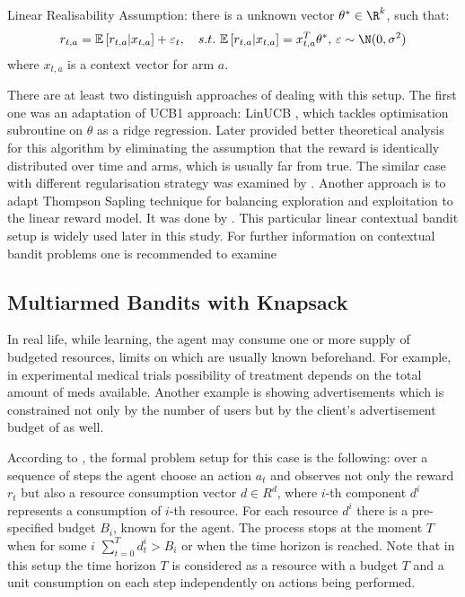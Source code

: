   \begin{definition}
      Linear Realisability Assumption: there is a unknown vector $\theta^* \in \R^k$, such that: 
        \begin{equation*}
                r_{t,a} = \E\left[r_{t,a}|x_{t,a}\right] + \varepsilon_t, \quad s.t. \,\E\left[r_{t,a}|x_{t,a}\right] = x_{t,a}^T\theta^*,\, \varepsilon \sim \N(0, \sigma^2)
        \end{equation*}  
        where $x_{t,a}$ is a context vector for arm $a$.
  \end{definition}
  There are at least two distinguish approaches of dealing with this setup. The first one was an adaptation of UCB1 approach: LinUCB \cite{Li2010}, which tackles optimisation subroutine on $\theta$ as a ridge regression. Later \cite{Abbasi-Yadkori2011} provided better theoretical analysis for this algorithm by eliminating the assumption that the reward is identically distributed over time and arms, which is usually far from true. The similar case with different regularisation strategy was examined by \cite{Auer2003}. Another approach is to adapt Thompson Sapling technique \cite{Li2011} for balancing exploration and exploitation to the linear reward model. It was done by \cite{Agrawal2013}. This particular linear contextual bandit setup is widely used later in this study. For further information on contextual bandit problems one is recommended to examine \cite{Zhou2015}
  
  \subsection{Multiarmed Bandits with Knapsack}
  In real life, while learning, the agent may consume one or more supply of budgeted resources, limits on which are usually known beforehand. For example, in experimental medical trials possibility of treatment depends on the total amount of meds available. Another example is showing advertisements which is constrained not only by the number of users but by the client's advertisement budget of as well. 
  
  According to \cite{Badanidiyuru2013}, the formal problem setup for this case is the following: over a sequence of steps the agent choose an action $a_t$ and observes not only the reward $r_t$ but also a resource consumption vector $d \in R^d$, where $i$-th component $d^i$ represents a consumption of $i$-th resource. For each resource $d^i$ there is a pre-specified budget $B_i$, known for the agent. The process stops at the moment $T$ when for some $i$ $\sum_{t=0}^Td^i_t > B_i$ or when the time horizon is reached. Note that in this setup the time horizon $T$ is considered as a resource with a budget $T$ and a unit consumption on each step independently on actions being performed.
  
